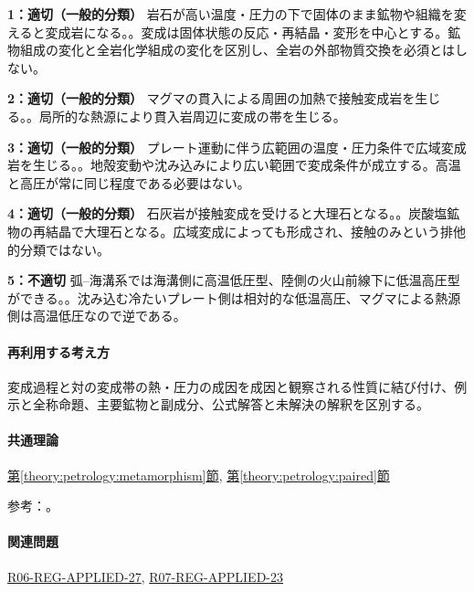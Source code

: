 \noindent\textbf{1：適切（一般的分類）} 岩石が高い温度・圧力の下で固体のまま鉱物や組織を変えると変成岩になる。。変成は固体状態の反応・再結晶・変形を中心とする。鉱物組成の変化と全岩化学組成の変化を区別し、全岩の外部物質交換を必須とはしない。\par

\noindent\textbf{2：適切（一般的分類）} マグマの貫入による周囲の加熱で接触変成岩を生じる。。局所的な熱源により貫入岩周辺に変成の帯を生じる。\par

\noindent\textbf{3：適切（一般的分類）} プレート運動に伴う広範囲の温度・圧力条件で広域変成岩を生じる。。地殻変動や沈み込みにより広い範囲で変成条件が成立する。高温と高圧が常に同じ程度である必要はない。\par

\noindent\textbf{4：適切（一般的分類）} 石灰岩が接触変成を受けると大理石となる。。炭酸塩鉱物の再結晶で大理石となる。広域変成によっても形成され、接触のみという排他的分類ではない。\par

\noindent\textbf{5：不適切} 弧–海溝系では海溝側に高温低圧型、陸側の火山前線下に低温高圧型ができる。。沈み込む冷たいプレート側は相対的な低温高圧、マグマによる熱源側は高温低圧なので逆である。\par

\paragraph{再利用する考え方} 変成過程と対の変成帯の熱・圧力の成因を成因と観察される性質に結び付け、例示と全称命題、主要鉱物と副成分、公式解答と未解決の解釈を区別する。

\paragraph{共通理論} \hyperref[theory:petrology:metamorphism]{第\ref*{theory:petrology:metamorphism}節}, \hyperref[theory:petrology:paired]{第\ref*{theory:petrology:paired}節}

\par 参考：\cite{aist_awa2021,nelson_contact2011,gsj_metamorphic_words}。

\paragraph{関連問題} \hyperref[q:r06-reg-applied-27]{R06-REG-APPLIED-27}, \hyperref[q:r07-reg-applied-23]{R07-REG-APPLIED-23}

